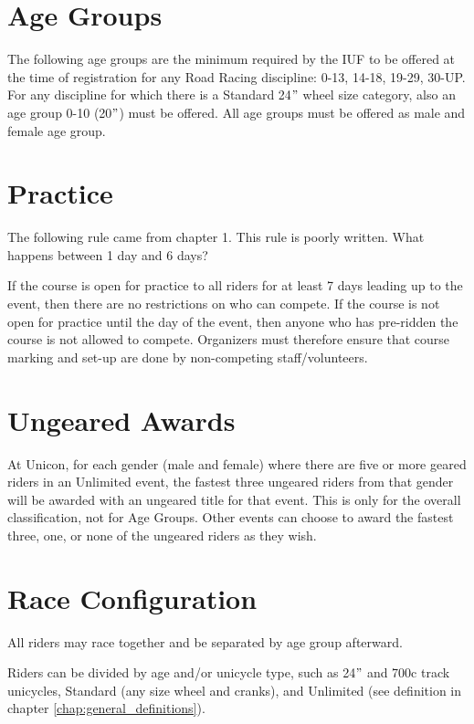 \section{Age Groups}

The following age groups are the minimum required by the IUF to be offered at the time of registration for any Road Racing discipline: 0-13, 14-18, 19-29, 30-UP.
For any discipline for which there is a Standard 24$"$ wheel size category, also an age group 0-10 (20$"$) must be offered.
All age groups must be offered as male and female age group.

\section{Practice}

\begin{comment-2016}
The following rule came from chapter 1. This rule is poorly written.  What happens between 1 day and 6 days?
\end{comment-2016}

If the course is open for practice to all riders for at least 7 days leading up to the event, then there are no restrictions on who can compete. 
If the course is not open for practice until the day of the event, then anyone who has pre-ridden the course is not allowed to compete. 
Organizers must therefore ensure that course marking and set-up are done by non-competing staff/volunteers.

\section{Ungeared Awards}
At Unicon, for each gender (male and female) where there are five or more geared riders in an Unlimited event, the fastest three ungeared riders from that gender will be awarded with an ungeared title for that event.
This is only for the overall classification, not for Age Groups.
Other events can choose to award the fastest three, one, or none of the ungeared riders as they wish.

\section{Race Configuration}

All riders may race together and be separated by age group afterward.

Riders can be divided by age and/or unicycle type, such as 24$"$ and 700c
track unicycles, Standard (any size wheel and cranks), and Unlimited (see
definition in chapter \ref{chap:general_definitions}).

